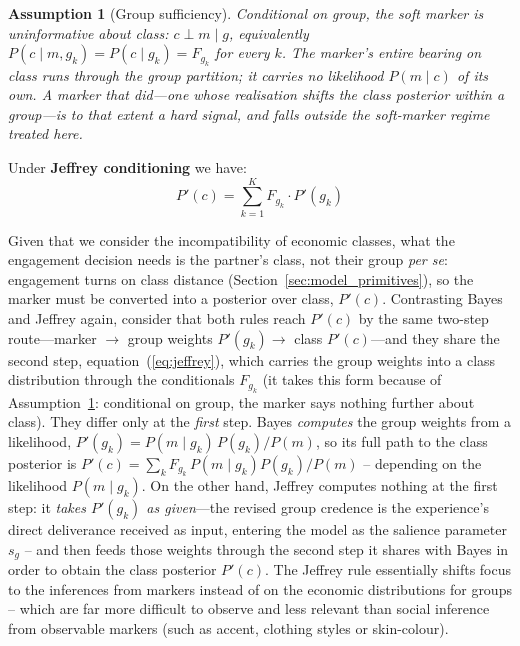 \documentclass[pdflatex,sn-basic]{sn-jnl}
\theoremstyle{thmstyleone}
\newtheorem{assumption}{Assumption}
\numberwithin{proposition}{subsection}
\begin{document}
\begin{assumption}[Group sufficiency]
\label{ass:sufficiency}
Conditional on group, the soft marker is uninformative about class:
$c \perp m \mid g$, equivalently $P(c \mid m, g_k) = P(c \mid g_k) =
F_{g_k}$ for every $k$. The marker's entire bearing on class runs
through the group partition; it carries no likelihood $P(m \mid c)$ of
its own. A marker that did---one whose realisation shifts the class
posterior \emph{within} a group---is to that extent a hard signal, and
falls outside the soft-marker regime treated here.
\end{assumption}

\noindent Under
\textbf{Jeffrey conditioning} we have:
\begin{equation}
  P'(c) = \sum_{k=1}^{K} F_{g_k} \cdot P'(g_k)
  \label{eq:jeffrey}
\end{equation}

Given that we consider the incompatibility of economic classes, what the engagement decision needs is the partner's class, not their group \emph{per se}: engagement turns on class distance (Section~\ref{sec:model_primitives}),
so the marker must be converted into a posterior over class, $P'(c)$.
Contrasting Bayes and Jeffrey again, consider that both rules reach $P'(c)$ by the same two-step route---marker $\to$ group weights $P'(g_k) \to$ class $P'(c)$---and they share the second
step, equation~(\ref{eq:jeffrey}), which carries the group weights into
a class distribution through the conditionals $F_{g_k}$ (it takes this
form because of Assumption~\ref{ass:sufficiency}: conditional on group,
the marker says nothing further about class). They differ only at the \emph{first} step. Bayes
\emph{computes} the group weights from a likelihood,
$P'(g_k) = P(m \mid g_k)\,P(g_k)/P(m)$, so its full path to the class
posterior is $P'(c) = \sum_k F_{g_k}\,P(m \mid g_k)P(g_k)/P(m)$ -- depending on the likelihood $P(m \mid g_k)$. On the other hand, Jeffrey computes
nothing at the first step: it \emph{takes $P'(g_k)$ as given}---the
revised group credence is the experience's direct deliverance received as input, entering the model as the salience
parameter $s_g$ -- and then feeds those weights through the second step it shares with Bayes in order to obtain the class posterior $P'(c)$. The Jeffrey rule essentially shifts focus to the inferences from markers instead of on the economic distributions for groups -- which are far more difficult to observe and less relevant than social inference from observable markers (such as accent, clothing styles or skin-colour).
\end{document}
